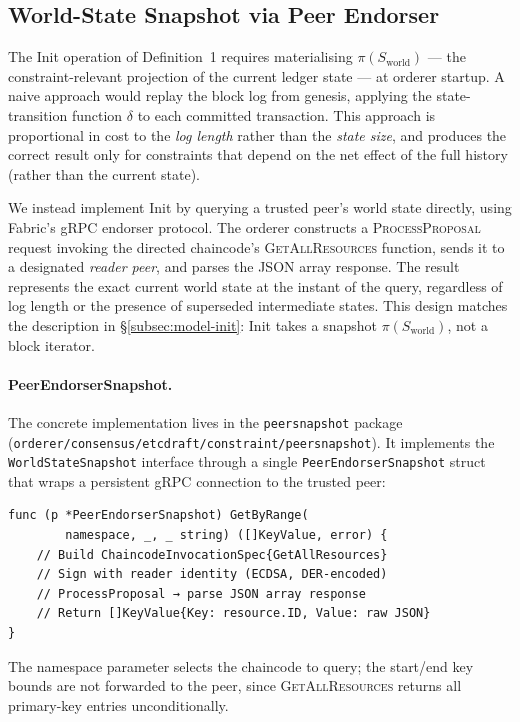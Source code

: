 \subsection{World-State Snapshot via Peer Endorser}
\label{subsec:impl-snapshot}

The Init operation of Definition~1 requires materialising $\pi(S_\text{world})$
— the constraint-relevant projection of the current ledger state — at orderer
startup.  A naive approach would replay the block log from genesis, applying
the state-transition function $\delta$ to each committed transaction.  This
approach is proportional in cost to the \emph{log length} rather than the
\emph{state size}, and produces the correct result only for constraints that
depend on the net effect of the full history (rather than the current state).

We instead implement Init by querying a trusted peer's world state directly,
using Fabric's gRPC endorser protocol.  The orderer constructs a
\textsc{ProcessProposal} request invoking the directed chaincode's
\textsc{GetAllResources} function, sends it to a designated \emph{reader peer},
and parses the JSON array response.  The result represents the exact current
world state at the instant of the query, regardless of log length or the
presence of superseded intermediate states.  This design matches the description
in \S\ref{subsec:model-init}: Init takes a snapshot $\pi(S_\text{world})$, not
a block iterator.

\paragraph{PeerEndorserSnapshot.}
The concrete implementation lives in the \texttt{peersnapshot} package
(\texttt{orderer/consensus/etcdraft/constraint/peersnapshot}).  It implements
the \texttt{WorldStateSnapshot} interface through a single
\texttt{PeerEndorserSnapshot} struct that wraps a persistent gRPC connection
to the trusted peer:
\begin{verbatim}
func (p *PeerEndorserSnapshot) GetByRange(
        namespace, _, _ string) ([]KeyValue, error) {
    // Build ChaincodeInvocationSpec{GetAllResources}
    // Sign with reader identity (ECDSA, DER-encoded)
    // ProcessProposal → parse JSON array response
    // Return []KeyValue{Key: resource.ID, Value: raw JSON}
}
\end{verbatim}
The namespace parameter selects the chaincode to query; the start/end key
bounds are not forwarded to the peer, since \textsc{GetAllResources} returns
all primary-key entries unconditionally.

